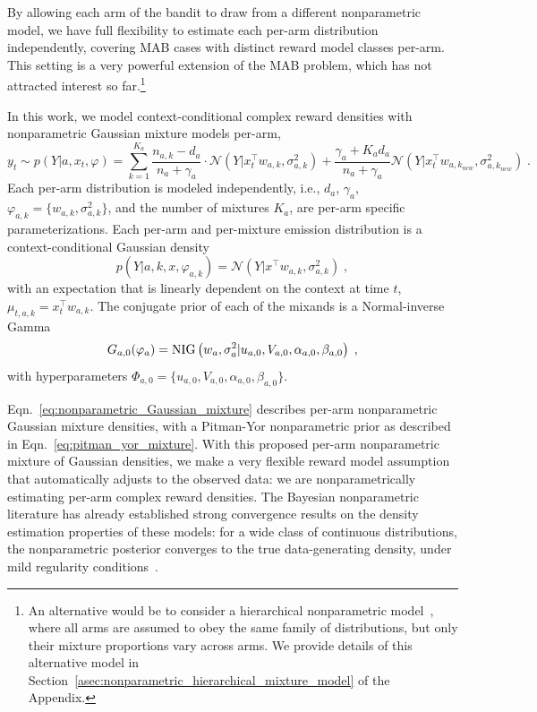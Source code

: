 \documentclass{article}
\newcommand{\ie}{i.e., }
\newcommand{\N}[1]{\mathcal{N}\left( #1\right)}
\newcommand{\NIG}[1]{{\rm NIG}\left( #1\right)}
\begin{document}
By allowing each arm of the bandit to draw from a different nonparametric model, we have full flexibility to estimate each per-arm distribution independently, covering MAB cases with distinct reward model classes per-arm. This setting is a very powerful extension of the MAB problem, which has not attracted interest so far.\footnote{An alternative would be to consider a hierarchical nonparametric model~\cite{j-Teh2006,j-Teh2010}, where all arms are assumed to obey the same family of distributions, but only their mixture proportions vary across arms. We provide details of this alternative model in Section~\ref{asec:nonparametric_hierarchical_mixture_model} of the Appendix.}

In this work, we model context-conditional complex reward densities with nonparametric Gaussian mixture models per-arm,
\begin{equation}
y_{t} \sim p(Y|a,x_t,\varphi) = \sum_{k=1}^{K_a} \frac{n_{a,k}-d_a}{n_a+\gamma_a} \cdot \N{Y|x_{t}^\top w_{a,k}, \sigma_{a,k}^2} + \frac{\gamma_a+K_ad_a}{n_a+\gamma_a} \N{Y|x_{t}^\top w_{a,k_{new}}, \sigma_{a,k_{new}}^2} \;.
\label{eq:nonparametric_Gaussian_mixture}
\end{equation}
Each per-arm distribution is modeled independently, \ie $d_a$, $\gamma_a$, $\varphi_{a,k}=\{w_{a,k}, \sigma_{a,k}^2 \}$, and the number of mixtures $K_a$, are per-arm specific parameterizations. Each per-arm and per-mixture emission distribution is a context-conditional Gaussian density
\begin{equation}
p(Y|a,k,x,\varphi_{a,k})=\N{Y|x^\top w_{a,k}, \sigma_{a,k}^2} \;,
\end{equation}
with an expectation that is linearly dependent on the context at time $t$, $\mu_{t,a,k}=x_t^\top w_{a,k}$. The conjugate prior of each of the mixands is a Normal-inverse Gamma
\begin{equation}
G_{a,0}(\varphi_a) = \NIG{w_a, \sigma_a^2 |u_{a,0}, V_{a,0},\alpha_{a,0}, \beta_{a,0}} \;,
\end{equation}
with hyperparameters $\varPhi_{a,0}=\{u_{a,0}, V_{a,0},\alpha_{a,0}, \beta_{a,0}\}$.

Eqn.~\eqref{eq:nonparametric_Gaussian_mixture} describes per-arm nonparametric Gaussian mixture densities, with a Pitman-Yor nonparametric prior as described in Eqn.~\eqref{eq:pitman_yor_mixture}. With this proposed per-arm nonparametric mixture of Gaussian densities, we make a very flexible reward model assumption that automatically adjusts to the observed data: we are nonparametrically estimating per-arm complex reward densities.
The Bayesian nonparametric literature has already established strong convergence results on the density estimation properties of these models: for a wide class of continuous distributions, the nonparametric posterior converges to the true data-generating density, under mild regularity conditions~\cite{j-Ghosal1999, j-Lijoi2004, j-Tokdar2006, j-Ghosal2007, j-Bhattacharya2010, j-Pati2013}.
 
\end{document}
